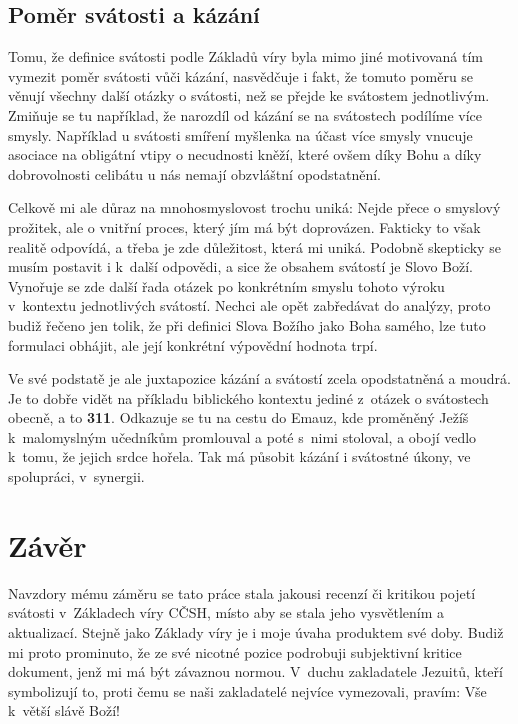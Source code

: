 \section{Poměr svátosti a kázání}

Tomu, že definice svátosti podle Základů víry byla mimo jiné motivovaná tím
vymezit poměr svátosti vůči kázání, nasvědčuje i fakt, že tomuto poměru se
věnují všechny další otázky o svátosti, než se přejde ke svátostem jednotlivým.
Zmiňuje se tu například, že narozdíl od kázání se na svátostech podílíme více
smysly. Například u svátosti smíření myšlenka na účast více smysly vnucuje
asociace na obligátní vtipy o necudnosti kněží, které ovšem díky Bohu a díky
dobrovolnosti celibátu u nás nemají obzvláštní opodstatnění.

Celkově mi ale důraz na mnohosmyslovost trochu uniká: Nejde přece o smyslový
prožitek, ale o vnitřní proces, který jím má být doprovázen. Fakticky to však
realitě odpovídá, a třeba je zde důležitost, která mi uniká. Podobně skepticky
se musím postavit i k~další odpovědi, a sice že obsahem svátostí je Slovo Boží.
Vynořuje se zde další řada otázek po konkrétním smyslu tohoto výroku v~kontextu
jednotlivých svátostí. Nechci ale opět zabředávat do analýzy, proto budiž řečeno
jen tolik, že při definici Slova Božího jako Boha samého, lze tuto formulaci
obhájit, ale její konkrétní výpovědní hodnota trpí.

Ve své podstatě je ale juxtapozice kázání a svátostí zcela opodstatněná a
moudrá. Je to dobře vidět na příkladu biblického kontextu jediné z~otázek o
svátostech obecně, a to \textbf{311}. Odkazuje se tu na cestu do Emauz, kde
proměněný Ježíš k~malomyslným učedníkům promlouval a poté s~nimi stoloval, a
obojí vedlo k~tomu, že jejich srdce hořela. Tak má působit kázání i svátostné
úkony, ve spolupráci, v~synergii.

\vspace{15mm}
\chapter{Závěr}

Navzdory mému záměru se tato práce stala jakousi recenzí či kritikou pojetí svátosti
v~Základech víry CČSH, místo aby se stala jeho vysvětlením a aktualizací. Stejně
jako Základy víry je i moje úvaha produktem své doby. Budiž mi proto prominuto,
že ze své nicotné pozice podrobuji subjektivní kritice dokument, jenž mi má být
závaznou normou. V~duchu zakladatele Jezuitů, kteří symbolizují to, proti čemu
se naši zakladatelé nejvíce vymezovali, pravím: Vše k~větší slávě Boží!

\label{div:zaver}

